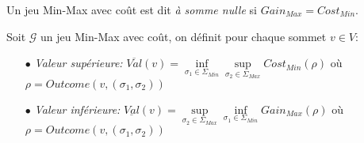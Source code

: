 
\begin{defi}
	Un jeu Min-Max avec coût est dit \textit{à somme nulle} si $Gain_{Max} = Cost_{Min}$.
\end{defi}


\begin{defi}
	
	Soit $\mathcal{G}$ un jeu Min-Max avec coût, on définit pour chaque sommet $v \in V$: 
	\begin{enumerate}
		\item[$\bullet$]\textit{Valeur supérieure:} $\overline{Val}(v) = \inf\limits_{\sigma _{1} \in \Sigma _{Min}} \sup\limits_{\sigma _{2} \in \Sigma_{Max}} Cost_{Min}(\rho)$ où $\rho = Outcome(v,(\sigma _{1},\sigma _{2}))$
		
		\item[$\bullet$]\textit{Valeur inférieure:} $\underline{Val}(v) = \sup\limits_{\sigma _{2} \in \Sigma_{Max}}  \inf\limits_{\sigma _{1} \in \Sigma _{Min}} Gain_{Max}(\rho)$  où $\rho = Outcome(v,(\sigma _{1},\sigma _{2}))$
	\end{enumerate}
\end{defi}



